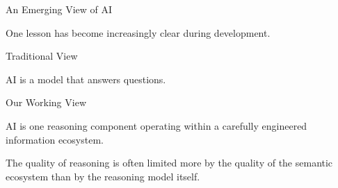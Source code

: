 \documentclass[aspectratio=169]{beamer}
\begin{document}
\begin{frame}{An Emerging View of AI}

One lesson has become increasingly clear during development.

\vspace{0.6cm}

\begin{block}{Traditional View}

AI is a model that answers questions.

\end{block}

\vspace{0.5cm}

\begin{block}{Our Working View}

AI is one reasoning component operating within a carefully
engineered information ecosystem.

\end{block}

\vspace{0.6cm}

The quality of reasoning is often limited more by the quality
of the semantic ecosystem than by the reasoning model itself.

\end{frame}
\end{document}
